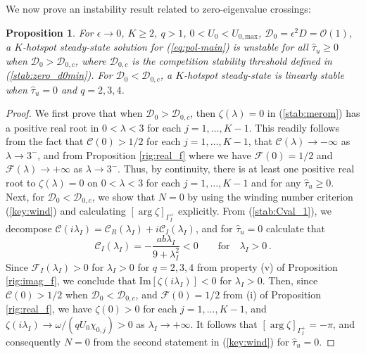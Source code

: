 \documentclass{article}%
\newtheorem{prop}[theorem]{Proposition}
\begin{document}
\noindent We now prove an instability result related to
zero-eigenvalue crossings:

\begin{prop}
\label{prop:comp_t} For $\epsilon\to 0$, $K\geq 2$, $q>1$, 
$0<U_0<U_{0,\textrm{max}}$, ${\mathcal D}_0=\epsilon^2 D = {\mathcal
  O}(1)$, a $K$-hotspot steady-state solution for (\ref{eq:pol-main})
is unstable for all $\hat{\tau}_u\geq 0$ when ${\mathcal
  D}_0>{\mathcal D}_{0,c}$, where ${\mathcal D}_{0,c}$ is the
competition stability threshold defined in
(\ref{stab:zero_d0min}). For ${\mathcal D}_0<{\mathcal D}_{0,c}$, a
$K$-hotspot steady-state is linearly stable when $\hat{\tau}_u=0$ and
$q=2,3,4$.
\end{prop}

\begin{proof} We first prove that when ${\mathcal D}_0>{\mathcal D}_{0,c}$,
then $\zeta(\lambda)=0$ in (\ref{stab:merom}) has a positive real root
in $0<\lambda<3$ for each $j=1,\ldots,K-1$. This readily follows from
the fact that ${\mathcal C}(0)>{1/2}$ for each $j=1,\ldots,K-1$, that
${\mathcal C}(\lambda)\to -\infty$ as $\lambda\to 3^{-}$, and
from Proposition \ref{rig:real_f} where we have ${\mathcal
  F}(0)={1/2}$ and ${\mathcal F}(\lambda)\to +\infty$ as $\lambda\to
3^{-}$. Thus, by continuity, there is at least one positive real root
to $\zeta(\lambda)=0$ on $0<\lambda<3$ for each $j=1,\ldots,K-1$ and
for any $\hat{\tau}_u\geq 0$. Next, for ${\mathcal D}_0<{\mathcal
  D}_{0,c}$, we show that $N=0$ by using the winding number
criterion (\ref{key:wind}) and calculating $\left[\arg \zeta
  \right]_{\Gamma_I^{+}}$ explicitly.  From (\ref{stab:Cval_1}), we
decompose ${\mathcal C}(i\lambda_I)={\mathcal C}_R(\lambda_I) +
i{\mathcal C}_I(\lambda_I)$, and for $\hat{\tau}_u=0$ calculate that
\begin{equation*}
   {\mathcal C}_I(\lambda_I) = -\frac{ a b \lambda_I}{9+\lambda_I^2} < 0
\qquad \mbox{for} \quad \lambda_I>0 \,.
\end{equation*}
Since ${\mathcal F}_I(\lambda_I)>0$ for $\lambda_I>0$ for $q=2,3,4$ from
property (v) of Proposition \ref{rig:imag_f}, we conclude that
$\mbox{Im}\left[\zeta(i\lambda_I)\right]<0$ for $\lambda_I>0$. Then, since
${\mathcal C}(0)>{1/2}$ when ${\mathcal D}_0<{\mathcal D}_{0,c}$,
and ${\mathcal F}(0)={1/2}$ from (i) of Proposition \ref{rig:real_f}, 
we have $\zeta(0)>0$ for each $j=1,\ldots,K-1$, and $\zeta(i\lambda_I)
\to {\omega/(qU_0\chi_{0,j})}>0$ as $\lambda_I\to +\infty$. It follows that
$\left[\arg \zeta \right]_{\Gamma_I^{+}}=-\pi$, and consequently $N=0$ from
the second statement in (\ref{key:wind}) for $\hat{\tau}_u=0$.
\end{proof}
\end{document}
